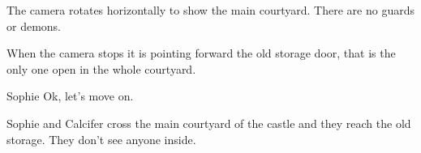 
\begin{screenplay}

The camera rotates horizontally to show the main courtyard. There are no guards or demons.

When the camera stops it is pointing forward the old storage door, that is the only one open in the whole courtyard.

\begin{dialogue}{Sophie}
Ok, let's move on.
\end{dialogue}

\end{screenplay}
\vspace{1em}

Sophie and Calcifer cross the main courtyard of the castle and they reach the old storage. They don't see anyone inside.

